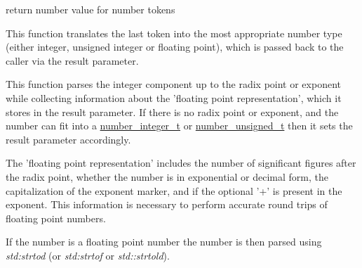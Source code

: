 return number value for number tokens 

This function translates the last token into the most appropriate number type (either integer, unsigned integer or floating point), which is passed back to the caller via the result parameter.

This function parses the integer component up to the radix point or exponent while collecting information about the 'floating point representation', which it stores in the result parameter. If there is no radix point or exponent, and the number can fit into a \hyperlink{classnlohmann_1_1basic__json_ac4b10b2364f26ce47bdb9a413ff04a59_ac4b10b2364f26ce47bdb9a413ff04a59}{number\-\_\-integer\-\_\-t} or \hyperlink{classnlohmann_1_1basic__json_a60a04166c122072ab11eaf9845d9cd1d_a60a04166c122072ab11eaf9845d9cd1d}{number\-\_\-unsigned\-\_\-t} then it sets the result parameter accordingly.

The 'floating point representation' includes the number of significant figures after the radix point, whether the number is in exponential or decimal form, the capitalization of the exponent marker, and if the optional '+' is present in the exponent. This information is necessary to perform accurate round trips of floating point numbers.

If the number is a floating point number the number is then parsed using {\itshape std\-:strtod} (or {\itshape std\-:strtof} or {\itshape std\-::strtold}).


